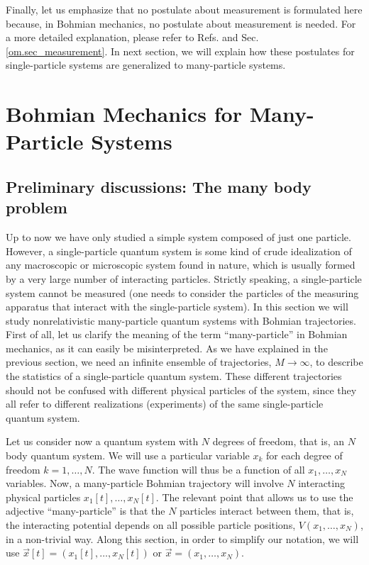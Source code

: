 \documentclass[nofootinbib, secnumarabic, amsmath, nobibnotes,10pt,aps,pra]{revtex4-1}
\newcommand{\sref}[1]{Sec. \ref{#1}}
\begin{document}
Finally, let us emphasize that no postulate about measurement is
 formulated here because, in Bohmian mechanics, no postulate about measurement is
needed. For a more detailed explanation, please refer to Refs.
\cite{om.Holand1993,om.Valentini2006,om.Bohmian1996,om.Durrllibre,om.reviewabc,om.llibreph} and
\sref{om.sec_measurement}. In next section, we will explain how
these postulates for single-particle systems are
generalized to many-particle systems.

\section{Bohmian Mechanics for Many-Particle Systems}\label{om.sec_many}

\subsection{Preliminary discussions: The many body problem}\label{om.sec_many.1}

Up to now we have only studied a simple system composed of just one
particle. However, a single-particle quantum system is some kind of
crude idealization of any macroscopic or microscopic system found in nature, which is usually formed by a very large number of interacting particles. Strictly speaking, a single-particle system cannot be measured  (one needs to consider the particles of the measuring apparatus that interact with the single-particle system). In this section we will study nonrelativistic
many-particle quantum systems with Bohmian trajectories. First of
all, let us clarify the meaning of the term ``many-particle'' in
Bohmian mechanics, as it can easily be misinterpreted. As we have
explained in the previous section, we need an infinite ensemble of
trajectories, $M\rightarrow\infty$, to describe the
statistics of a single-particle quantum system. These different
trajectories should not be confused with different physical particles of the system, since they all refer to different realizations (experiments) of the same
single-particle quantum system.

Let us consider  now a quantum system with $N$ degrees of freedom,
that is, an $N$ body quantum system. We will use a particular
variable $x_k$ for each degree of freedom $k = 1,\ldots,N$. The wave
function will thus be a function of all $x_{1},\ldots,x_{N}$
variables. Now, a many-particle Bohmian trajectory will involve $N$
interacting physical particles $x_{1}[t],\ldots,x_{N}[t]$. The relevant point
that allows us to use the adjective ``many-particle'' is that the
$N$ particles interact between them, that is, the interacting
potential depends on all possible particle positions,
$V(x_{1},\ldots,x_{N})$, in a non-trivial way. Along this section, in order to simplify our
notation, we will use $\vec{x}[t] = (x_{1}[t],\ldots,x_{N}[t])$ or
$\vec{x} = (x_{1},\ldots,x_{N})$.
\end{document}
